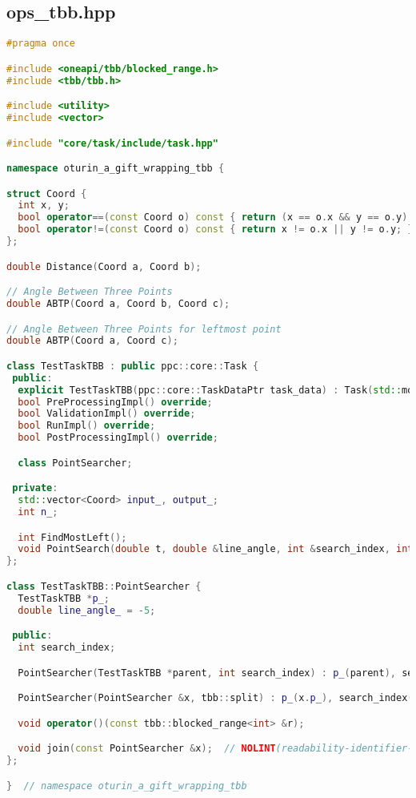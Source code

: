 \documentclass[12pt,a4paper]{extarticle}
\begin{document}
\subsection{ops\_tbb.hpp}
\label{sec:tbb.hpp}
\begin{lstlisting}[language=C++]
#pragma once

#include <oneapi/tbb/blocked_range.h>
#include <tbb/tbb.h>

#include <utility>
#include <vector>

#include "core/task/include/task.hpp"

namespace oturin_a_gift_wrapping_tbb {

struct Coord {
  int x, y;
  bool operator==(const Coord o) const { return (x == o.x && y == o.y); }
  bool operator!=(const Coord o) const { return x != o.x || y != o.y; }
};

double Distance(Coord a, Coord b);

// Angle Between Three Points
double ABTP(Coord a, Coord b, Coord c);

// Angle Between Three Points for leftmost point
double ABTP(Coord a, Coord c);

class TestTaskTBB : public ppc::core::Task {
 public:
  explicit TestTaskTBB(ppc::core::TaskDataPtr task_data) : Task(std::move(task_data)) {}
  bool PreProcessingImpl() override;
  bool ValidationImpl() override;
  bool RunImpl() override;
  bool PostProcessingImpl() override;

  class PointSearcher;

 private:
  std::vector<Coord> input_, output_;
  int n_;

  int FindMostLeft();
  void PointSearch(double t, double &line_angle, int &search_index, int i);
};

class TestTaskTBB::PointSearcher {
  TestTaskTBB *p_;
  double line_angle_ = -5;

 public:
  int search_index;

  PointSearcher(TestTaskTBB *parent, int search_index) : p_(parent), search_index(search_index) {}

  PointSearcher(PointSearcher &x, tbb::split) : p_(x.p_), search_index(x.search_index) {}

  void operator()(const tbb::blocked_range<int> &r);

  void join(const PointSearcher &x);  // NOLINT(readability-identifier-naming): tbb using this name
};

}  // namespace oturin_a_gift_wrapping_tbb
\end{lstlisting}
\end{document}
